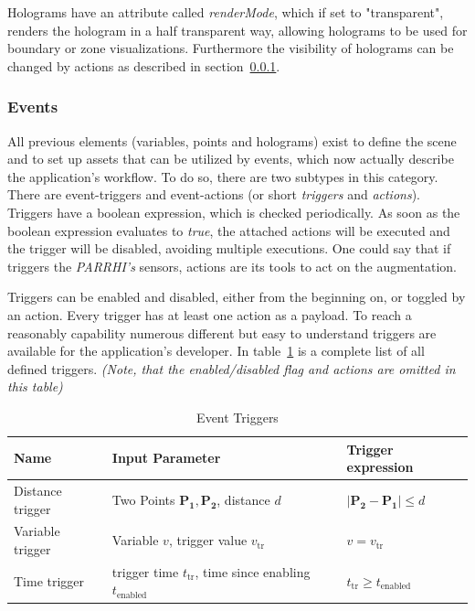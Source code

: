 Holograms have an attribute called \textit{renderMode}, which if set to "transparent", renders the hologram in a half transparent way, allowing holograms to be used for boundary or zone visualizations. Furthermore the visibility of holograms can be changed by actions as described in section~\ref{Section:Events}.

\subsubsection{Events}\label{Section:Events}
All previous elements (variables, points and holograms) exist to define the scene and to set up assets that can be utilized by events, which now actually describe the application's workflow. To do so, there are two subtypes in this category. There are event-triggers and event-actions (or short \textit{triggers} and \textit{actions}). Triggers have a boolean expression, which is checked periodically. As soon as the boolean expression evaluates to \textit{true}, the attached actions will be executed and the trigger will be disabled, avoiding multiple executions. One could say that if triggers the \textit{PARRHI's} sensors, actions are its tools to act on the augmentation. 

Triggers can be enabled and disabled, either from the beginning on, or toggled by an action. Every trigger has at least one action as a payload. To reach a reasonably capability numerous different but easy to understand triggers are available for the application's developer. In table~\ref{Table:Triggers} is a complete list of all defined triggers. \textit{(Note, that the enabled/disabled flag and actions are omitted in this table)}

 
 \begin{table}
 	\caption{Event Triggers}
 	\label{Table:Triggers}
 	\centering
 	\begin{tabular}{lll}
 		\toprule
 		Name & Input Parameter		& Trigger expression	\\		
 		\midrule
 		Distance trigger & Two Points $\boldsymbol{P_1}, \boldsymbol{P_2}$, distance $d$		&  $|\boldsymbol{P_2}-\boldsymbol{P_1}| \le d$ \\
		Variable trigger & Variable $v$, trigger value $v_{\text{tr}}$ 		& $v = v_{\text{tr}}$	 \\
		Time trigger & trigger time $t_{\text{tr}}$, time since enabling $t_{\text{enabled}}$ & $t_{\text{tr}} \geq t_{\text{enabled}}$\\
		\bottomrule
	\end{tabular}
\end{table}

